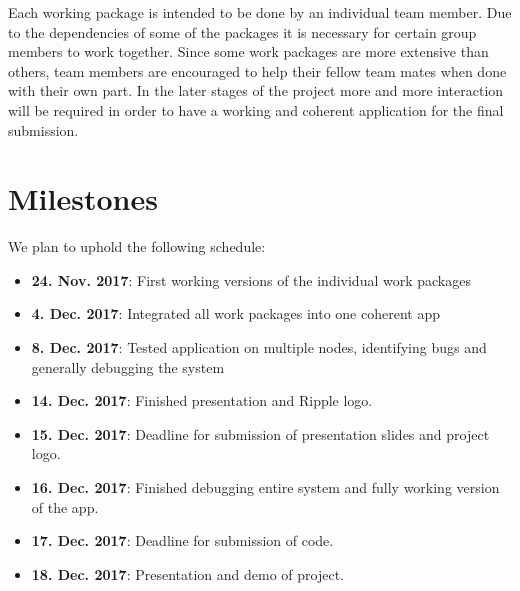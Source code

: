 \documentclass{report}
\begin{document}
Each working package is intended to be done by an individual team member. Due to the dependencies of some of the packages it is necessary for certain group members to work together. Since some work packages are more extensive than others, team members are encouraged to help their fellow team mates when done with their own part. In the later stages of the project more and more interaction will be required in order to have a working and coherent application for the final submission. 
 
\section{Milestones}

We plan to uphold the following schedule:
\begin{itemize}
\item  \textbf{24. Nov. 2017}: First working versions of the individual work packages
\item  \textbf{4. Dec. 2017}: Integrated all work packages into one coherent app
\item \textbf{8. Dec. 2017}: Tested application on multiple nodes, identifying bugs and generally debugging the system
\item \textbf{14. Dec. 2017}: Finished presentation and Ripple logo. 
\item \textbf{15. Dec. 2017}: Deadline for submission of presentation slides and project logo.
\item \textbf{16. Dec. 2017}: Finished debugging entire system and fully working version of the app.
\item \textbf{17. Dec. 2017}: Deadline for submission of code.
\item \textbf{18. Dec. 2017}: Presentation and demo of project.
\end{itemize}




\end{document}
